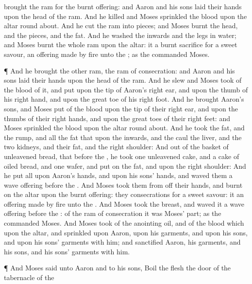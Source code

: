 {brought the
ram for the burnt
offering: and
Aaron and his
sons
laid their
hands upon the
head of the
ram.
And he
killed
{} and
Moses
sprinkled the
blood upon the
altar round
about.
And he
cut the
ram into
pieces; and
Moses
burnt the
head, and the
pieces, and the
fat.
And he
washed the
inwards and the
legs in
water; and
Moses
burnt the whole
ram upon the
altar: it
{} a burnt
sacrifice for a
sweet
savour,
{} an offering made by
fire unto the
{}; as the
{}
commanded
Moses.
\par }{\PP {}¶ And he
brought the
other
ram, the
ram of
consecration: and
Aaron and his
sons
laid their
hands upon the
head of the
ram.
And he
slew
{} and
Moses
took of the
blood of it, and
put
{} upon the
tip of
Aaron’s
right
ear, and upon the
thumb of his
right
hand, and upon the great
toe of his
right
foot.
And he
brought
Aaron’s
sons, and
Moses
put of the
blood upon the
tip of their
right
ear, and upon the
thumbs of their
right
hands, and upon the great
toes of their
right
feet: and
Moses
sprinkled the
blood upon the
altar round
about.
And he
took the
fat, and the
rump, and all the
fat that
{} upon the
inwards, and the
caul
{} the
liver, and the
two
kidneys, and their
fat, and the
right
shoulder:
And out of the
basket of
unleavened
bread, that
{}
before the
{}, he
took
one
unleavened
cake, and a
cake of
oiled bread, and
one
wafer, and
put
{} on the
fat, and upon the
right
shoulder:
And he
put all upon
Aaron’s
hands, and upon his
sons’
hands, and
waved them
{} a wave
offering
before the
{}.
And
Moses
took them from off their
hands, and
burnt
{} on the
altar upon the burnt
offering: they
{}
consecrations for a
sweet
savour: it
{} an offering made by
fire unto the
{}.
And
Moses
took the
breast, and
waved it
{} a wave
offering
before the
{}:
{} of the
ram of
consecration it was
Moses’
part; as the
{}
commanded
Moses.
And
Moses
took of the
anointing
oil, and of the
blood which
{} upon the
altar, and
sprinkled
{} upon
Aaron,
{} upon his
garments, and upon his
sons, and upon his
sons’
garments with him; and
sanctified
Aaron,
{} his
garments, and his
sons, and his
sons’
garments with him.
\par }{\PP {}¶ And
Moses
said unto
Aaron and to his
sons,
Boil the
flesh
{} the
door of the
tabernacle of the
}
